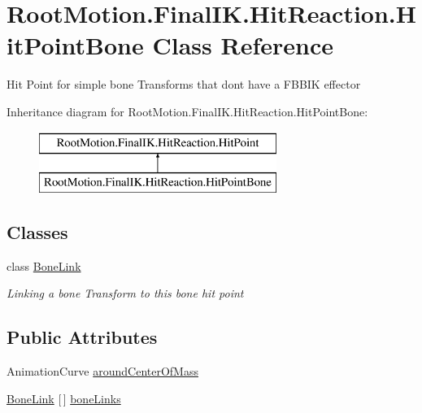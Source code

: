 \hypertarget{class_root_motion_1_1_final_i_k_1_1_hit_reaction_1_1_hit_point_bone}{}\section{Root\+Motion.\+Final\+I\+K.\+Hit\+Reaction.\+Hit\+Point\+Bone Class Reference}
\label{class_root_motion_1_1_final_i_k_1_1_hit_reaction_1_1_hit_point_bone}


Hit Point for simple bone Transforms that don\textquotesingle{}t have a F\+B\+B\+IK effector  


Inheritance diagram for Root\+Motion.\+Final\+I\+K.\+Hit\+Reaction.\+Hit\+Point\+Bone\+:\begin{figure}[H]
\begin{center}
\leavevmode
\includegraphics[height=2.000000cm]{class_root_motion_1_1_final_i_k_1_1_hit_reaction_1_1_hit_point_bone}
\end{center}
\end{figure}
\subsection*{Classes}
\begin{DoxyCompactItemize}
\item 
class \mbox{\hyperlink{class_root_motion_1_1_final_i_k_1_1_hit_reaction_1_1_hit_point_bone_1_1_bone_link}{Bone\+Link}}
\begin{DoxyCompactList}\small\item\em Linking a bone Transform to this bone hit point \end{DoxyCompactList}\end{DoxyCompactItemize}
\subsection*{Public Attributes}
\begin{DoxyCompactItemize}
\item 
Animation\+Curve \mbox{\hyperlink{class_root_motion_1_1_final_i_k_1_1_hit_reaction_1_1_hit_point_bone_acd6ae62c8f30c0d5e861036085ae6817}{around\+Center\+Of\+Mass}}
\item 
\mbox{\hyperlink{class_root_motion_1_1_final_i_k_1_1_hit_reaction_1_1_hit_point_bone_1_1_bone_link}{Bone\+Link}} \mbox{[}$\,$\mbox{]} \mbox{\hyperlink{class_root_motion_1_1_final_i_k_1_1_hit_reaction_1_1_hit_point_bone_a1def1047ea3f76f20a4efcc88ca21784}{bone\+Links}}
\end{DoxyCompactItemize}
